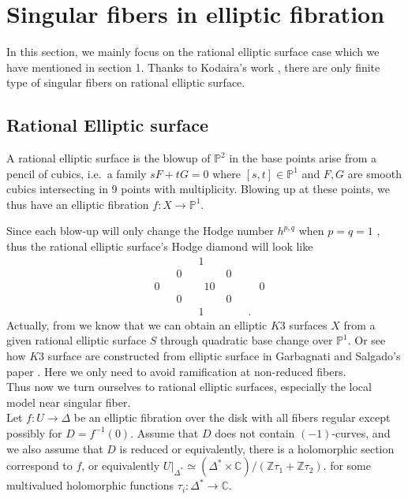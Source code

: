 
\section{Singular fibers in elliptic fibration}
In this section, we mainly focus on the rational elliptic surface case which we have mentioned in section 1. Thanks to Kodaira's work \cite{kodaira1963compact}, there are only finite type of singular fibers on rational elliptic surface.
\subsection{Rational Elliptic surface}
\begin{definition}
A rational elliptic surface is the blowup of $\mathbb{P}^2$ in the base points arise from  a pencil of cubics, i.e.\ a family $sF+tG=0$ where $[s,t]\in\mathbb{P}^1$ and $F,G$ are smooth cubics intersecting in 9 points with multiplicity. Blowing up at these points, we thus have an elliptic fibration $f\colon X\rightarrow\mathbb{P}^1$.
\end{definition}
Since each blow-up will only change the Hodge number $h^{p,q}$ when $p=q=1$ \cite{rao2019dolbeault}, thus the rational elliptic surface's Hodge diamond will look like
\begin{displaymath}
\begin{split}
&\qquad  \qquad 1\\
&\qquad 0 \qquad \qquad 0\\
&0 \qquad \qquad \!\!\! 10 \qquad \qquad \!\! 0\\
& \qquad 0 \qquad \qquad 0\\
& \qquad \qquad 1 \qquad \qquad .
\end{split}
\end{displaymath}
\indent Actually, from \cite{schutt2019elliptic} we know that we can obtain an elliptic $K3$ surfaces $X$ from a given rational elliptic surface $S$ through quadratic base change over $\mathbb{P}^1$. Or see how $K3$ surface are constructed from elliptic surface in Garbagnati and Salgado's paper \cite{garbagnati2019linear}. Here we only need to avoid ramification at non-reduced fibers.\\ \indent
Thus now we turn ourselves to rational elliptic surfaces, especially the local model near singular fiber.\\ \indent
Let $f\colon U\rightarrow \Delta$ be an elliptic fibration over the disk with all fibers regular except possibly for $D=f^{-1}(0)$. Assume that $D$ does not contain $(-1)$-curves, and we also assume that $D$ is reduced or equivalently, there is a holomorphic section correspond to $f$, or equivalently $U|_{\Delta^*}\simeq(\Delta^*\times\mathbb{C})/(\mathbb{Z}\tau_1+\mathbb{Z}\tau_2).$ for some multivalued holomorphic functions $\tau_i\colon\Delta^*\rightarrow\mathbb{C}$.\\ \indent
